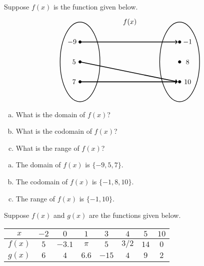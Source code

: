 \documentclass[11pt,letterpaper]{article}
\begin{document}
 Suppose $f(x)$ is the function given below.
	\[
	\begin{tikzpicture}
	\node at (2.5,2) {$f(x)$};
	\draw[line width=0.03cm] (0,0) circle (1 and 2);
	\draw[line width=0.03cm] (5,0) circle (1 and 2);
	
	\draw[fill=black] (0,1) circle (0.07);
	\draw[fill=black] (0,0) circle (0.07);
	\draw[fill=black] (0,-1) circle (0.07);
	
	\draw[fill=black] (5,1) circle (0.07);
	\draw[fill=black] (5,0) circle (0.07);
	\draw[fill=black] (5,-1) circle (0.07);
	
	\draw[line width=0.04cm,->] (0,1) -- (4.9,1);
	\draw[line width=0.04cm,->] (0,0) -- (4.9,-1);
	\draw[line width=0.04cm,->] (0,-1) -- (4.9,-1);
	
	\node at (-0.4,1) {$-9$};
	\node at (-0.3,0) {$5$};
	\node at (-0.3,-1) {$7$};
	
	\node at (5.4,1) {$-1$};
	\node at (5.4,0) {$8$};
	\node at (5.4,-1) {$10$};
	\end{tikzpicture}
	\]

\begin{enumerate}[(a)]
\item What is the domain of $f(x)$?
\item What is the codomain of $f(x)$?
\item What is the range of $f(x)$?
\end{enumerate} \pspace

\sol
{\itshape
\begin{enumerate}[(a)]
\item The domain of $f(x)$ is $\{ -9, 5, 7 \}$.

\item The codomain of $f(x)$ is $\{ -1, 8, 10 \}$.

\item The range of $f(x)$ is $\{ -1, 10 \}$. 
\end{enumerate}
}





\newpage





 Suppose $f(x)$ and $g(x)$ are the functions given below. 
        \begin{table}[!ht]
        \centering
        \begin{tabular}{| c || c | c | c | c | c | c | c |} \hline
	$x$ & $-2$ & $0$ & $1$ & $3$ & $4$ & $5$ & $10$ \\ \hline
	$f(x)$ & $5$ & $-3.1$ & $\pi$ & $5$ & $3/2$ & $14$ & $0$ \\ \hline
	$g(x)$ & $6$ & $4$ & $6.6$ & $-15$ & $4$ & $9$ & $2$ \\ \hline
        \end{tabular}
        \end{table}
\end{document}
